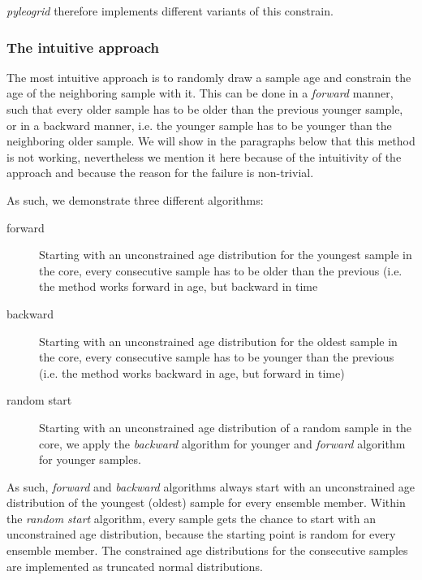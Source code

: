 \begin{refsection}
\textit{pyleogrid} therefore implements different variants of this constrain. 

\subsubsection{The intuitive approach}
The most intuitive approach is to randomly draw a sample age and constrain the age of the neighboring sample with it. This can be done in a \textit{forward} manner, such that every older sample has to be older than the previous younger sample, or in a backward manner, i.e. the younger sample has to be younger than the neighboring older sample. We will show in the paragraphs below that this method is not working, nevertheless we mention it here because of the intuitivity of the approach and because the reason for the failure is non-trivial.

As such, we demonstrate three different algorithms:

\begin{description}
	\item[forward] Starting with an unconstrained age distribution for the youngest sample in the core, every consecutive sample has to be older than the previous (i.e. the method works forward in age, but backward in time
	\item[backward] Starting with an unconstrained age distribution for the oldest sample in the core, every consecutive sample has to be younger than the previous (i.e. the method works backward in age, but forward in time)
	\item[random start] Starting with an unconstrained age distribution of a random sample in the core, we apply the \textit{backward} algorithm for younger and \textit{forward} algorithm for younger samples.
\end{description}

As such, \textit{forward} and \textit{backward} algorithms always start with an unconstrained age distribution of the youngest (oldest) sample for every ensemble member. Within the \textit{random start} algorithm, every sample gets the chance to start with an unconstrained age distribution, because the starting point is random for every ensemble member. The constrained age distributions for the consecutive samples are implemented as truncated normal distributions.


\end{refsection}
